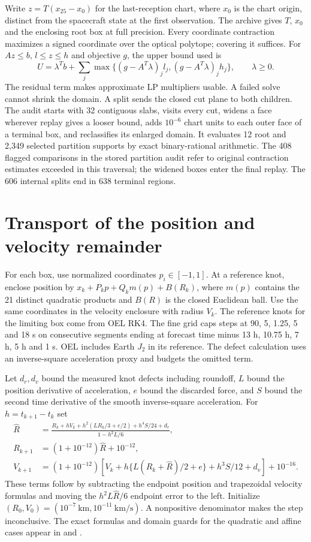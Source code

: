 \documentclass[10pt,letterpaper]{article}
\newcommand{\file}[1]{\texttt{\detokenize{#1}}}
\begin{document}
Write $z=T(x_{25}-x_0)$ for the last-reception chart, where $x_0$ is the chart origin, distinct from the spacecraft state at the first observation. The archive gives $T$, $x_0$ and the enclosing root box at full precision. Every coordinate contraction maximizes a signed coordinate over the optical polytope; covering it suffices. For $Az\le b$, $l\le z\le h$ and objective $g$, the upper bound used is
\[
 U=\lambda^T b + \sum_j\max\{(g-A^T\lambda)_j l_j,(g-A^T\lambda)_j h_j\},
 \qquad \lambda\ge0 .
\]
The residual term makes approximate LP multipliers usable. A failed solve cannot shrink the domain. A split sends the closed cut plane to both children. The audit starts with 32 contiguous slabs, visits every cut, widens a face wherever replay gives a looser bound, adds $10^{-6}$ chart units to each outer face of a terminal box, and reclassifies its enlarged domain. It evaluates 12 root and 2,349 selected partition supports by exact binary-rational arithmetic. The 408 flagged comparisons in the stored partition audit refer to original contraction estimates exceeded in this traversal; the widened boxes enter the final replay. The 606 internal splits end in 638 terminal regions.

\section{Transport of the position and velocity remainder}
For each box, use normalized coordinates $p_i\in[-1,1]$. At a reference knot, enclose position by
$x_k+P_k p+Q_k m(p)+B(R_k)$, where $m(p)$ contains the 21 distinct quadratic products and $B(R)$ is the closed Euclidean ball. Use the same coordinates in the velocity enclosure with radius $V_k$. The reference knots for the limiting box come from OEL RK4. The fine grid caps steps at 90, 5, 1.25, 5 and 18 s on consecutive segments ending at forecast time minus 13 h, 10.75 h, 7 h, 5 h and 1 s. OEL includes Earth $J_2$ in its reference. The defect calculation uses an inverse-square acceleration proxy and budgets the omitted term.

Let $d_r,d_v$ bound the measured knot defects including roundoff, $L$ bound the position derivative of acceleration, $e$ bound the discarded force, and $S$ bound the second time derivative of the smooth inverse-square acceleration. For $h=t_{k+1}-t_k$ set
\begin{align*}
 \widehat R&=\frac{R_k+hV_k+h^2(LR_k/3+e/2)+h^4S/24+d_r}{1-h^2L/6},\\
 R_{k+1}&=(1+10^{-12})\widehat R+10^{-12},\\
 V_{k+1}&=(1+10^{-12})[V_k+h\{L(R_k+\widehat R)/2+e\}+h^3S/12+d_v]+10^{-16}.
\end{align*}
These terms follow by subtracting the endpoint position and trapezoidal velocity formulas and moving the $h^2L\widehat R/6$ endpoint error to the left. Initialize $(R_0,V_0)=(10^{-7}\ \mathrm{km},10^{-11}\ \mathrm{km/s})$. A nonpositive denominator makes the step inconclusive. The exact formulas and domain guards for the quadratic and affine cases appear in \file{quadratic.py} and \file{affine_cells.py}.
\end{document}
